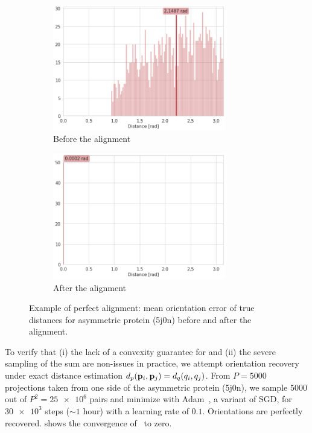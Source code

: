 \begin{figure}[!]
    \centering
    \begin{subfigure}[b]{0.45\textwidth}
        \includegraphics[height=5.5cm]{images/5j0n_perfect_angle_ralignment_before.png}
        \caption{Before the alignment}
    \end{subfigure}
    \hfill
    \begin{subfigure}[b]{0.5\textwidth}
    \centering
        \includegraphics[height=5.5cm]{images/5j0n_perfect_angle_ralignment_after.png}
        \caption{After the alignment}
    \end{subfigure}
    \caption{ Example of perfect alignment: mean orientation error of true distances for asymmetric protein (5j0n) before and after the alignment.}
    \label{fig:angle-alignment-perfect}
\end{figure}


To verify that (i) the lack of a convexity guarantee for  and (ii) the severe sampling of the sum are non-issues in practice, we attempt orientation recovery under exact distance estimation $d_p(\mathbf{p}_i, \mathbf{p}_j) = d_q(q_i, q_j)$.
From $P=5000$ projections taken from one side of the asymmetric protein (5j0n), we sample $5000$ out of $P^2 = \num{25e6}$ pairs and minimize  with Adam~\cite{kingma2014adam}, a variant of SGD, for $\num{30e3}$ steps ($\sim 1$ hour) with a learning rate of $0.1$.
Orientations are perfectly recovered.
 shows the convergence of~ to zero.

